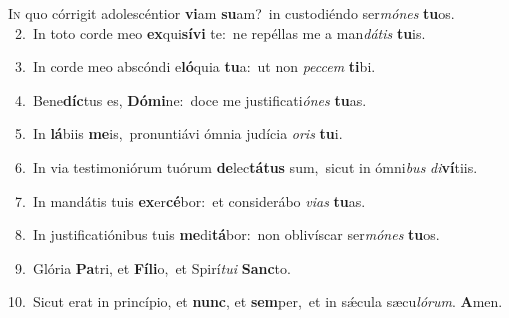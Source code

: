 \lettrine{\initial\textcolor{\initialcolor}{I}}{n} quo córrigit adolescéntior \textbf{vi}\-am \textbf{su}\-am?~\star in custodiéndo ser\-\textit{mó}\-\textit{nes} \textbf{tu}\-os.\\
{\numbfont\textcolor{\numbcolor}{~2.}}~In toto corde meo \textbf{ex}\-qui\-\textbf{sí}\-\textbf{vi} te:~\star ne repéllas me a man\-\textit{dá}\-\textit{tis} \textbf{tu}\-is.\par
{\numbfont\textcolor{\numbcolor}{~3.}}~In corde meo abscóndi e\-\textbf{ló}\-quia \textbf{tu}\-a:~\star ut non \textit{pec}\-\textit{cem} \textbf{ti}\-bi.\par
{\numbfont\textcolor{\numbcolor}{~4.}}~Bene\-\textbf{díc}\-tus es, \textbf{Dó}\-\textbf{mi}ne:~\star doce me justificati\-\textit{ó}\-\textit{nes} \textbf{tu}\-as.\par
{\numbfont\textcolor{\numbcolor}{~5.}}~In \textbf{lá}\-biis \textbf{me}\-is,~\star pronuntiávi ómnia judícia \textit{o}\-\textit{ris} \textbf{tu}\-i.\par
{\numbfont\textcolor{\numbcolor}{~6.}}~In via testimoniórum tuórum \textbf{de}\-lec\-\textbf{tá}\-\textbf{tus} sum,~\star sicut in ómni\textit{bus} \textit{di}\-\textbf{ví}tiis.\par
{\numbfont\textcolor{\numbcolor}{~7.}}~In mandátis tuis \textbf{ex}\-er\-\textbf{cé}\-bor:~\star et considerábo \textit{vi}\-\textit{as} \textbf{tu}\-as.\par
{\numbfont\textcolor{\numbcolor}{~8.}}~In justificatiónibus tuis \textbf{me}\-di\-\textbf{tá}\-bor:~\star non oblivíscar ser\-\textit{mó}\-\textit{nes} \textbf{tu}\-os.\par
{\numbfont\textcolor{\numbcolor}{~9.}}~Glória \textbf{Pa}\-tri, et \textbf{Fí}\-\textbf{li}o,~\star et Spirí\-\textit{tu}\-\textit{i} \textbf{Sanc}\-to.\par
{\numbfont\textcolor{\numbcolor}{10.}}~Sicut erat in princípio, et \textbf{nunc}\-, et \textbf{sem}\-per,~\star et in sǽcula sæcu\-\textit{ló}\-\textit{rum}. \textbf{A}\-men.\par

